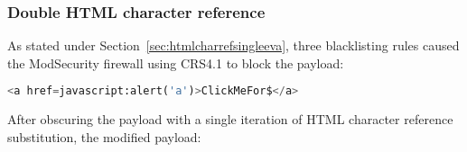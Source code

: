 %
%
%
%
%
%


\subsubsection{Double HTML character reference}
\label{sec:doublehtmlcharref}
As stated under Section~\ref{sec:htmlcharrefsingleeva}, three blacklisting rules caused the ModSecurity firewall using CRS4.1 to block the payload:

\begin{lstlisting}[style=basicStyle, language=Python]
<a href=javascript:alert('a')>ClickMeFor$</a>
\end{lstlisting}

After obscuring the payload with a single iteration of HTML character reference substitution, the modified payload:

